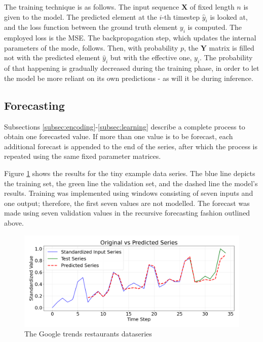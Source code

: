 \documentclass[algorithms,article,submit,pdftex,moreauthors]{Definitions/mdpi}
\begin{document}
The training technique is as follows. The input sequence $\textbf{X}$ of fixed length $n$ is given to the model. The predicted element at the $i$-th timestep $\hat y_i$ is looked at, and the loss function between the ground truth element $y_i$ is computed. The employed loss is the MSE. The backpropagation step, which updates the internal parameters of the mode, follows. Then, with probability $p$, the $\textbf{Y}$ matrix is filled not with the predicted element $\hat y_i$ but with the effective one, $y_i$. The probability of that happening is gradually decreased during the training phase, in order to let the model be more reliant on its own predictions - as will it be during inference.


\subsection{Forecasting} \label{subsec:forecasting}

Subsections \ref{subsec:encoding}-\ref{subsec:learning} describe a complete process to obtain one forecasted value. If more than one value is to be forecast, each additional forecast is appended to the end of the series, after which the process is repeated using the same fixed parameter matrices.

Figure \ref{fig:restaurants} shows the results for the tiny example data series. The blue line depicts the training set, the green line the validation set, and the dashed line the model's results. Training was implemented using windows consisting of seven inputs and one output; therefore, the first seven values are not modelled. The forecast was made using seven validation values in the recursive forecasting fashion outlined above.

\begin{figure}
    \centering
    \includegraphics[width=0.95\linewidth]{restaurants.png}
    \caption{The Google trends restaurants dataseries}
    \label{fig:restaurants}
\end{figure}
\end{document}

